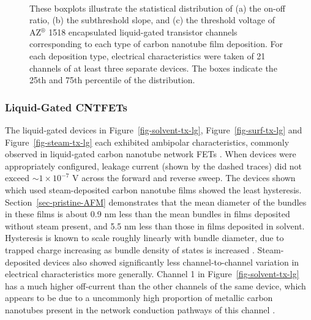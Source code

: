 \documentclass[
  a4paper,
]{scrbook}
\begin{document}
\begin{figure}
\begin{minipage}[t]{0.47\linewidth}
{{}

}

\subcaption{\label{fig-threshold-voltage}}
\end{minipage}%
%
\begin{minipage}[t]{0.26\linewidth}

{\centering 

~

}

\end{minipage}%

\caption{\label{fig-sweep-parameters}These boxplots illustrate the
statistical distribution of (a) the on-off ratio, (b) the subthreshold
slope, and (c) the threshold voltage of AZ\(^\circledR\) 1518
encapsulated liquid-gated transistor channels corresponding to each type
of carbon nanotube film deposition. For each deposition type, electrical
characteristics were taken of 21 channels of at least three separate
devices. The boxes indicate the 25th and 75th percentile of the
distribution.}

\end{figure}

\hypertarget{liquid-gated-cntfets}{%
\subsubsection*{Liquid-Gated CNTFETs}\label{liquid-gated-cntfets}}

The liquid-gated devices in Figure~\ref{fig-solvent-tx-lg},
Figure~\ref{fig-surf-tx-lg} and Figure~\ref{fig-steam-tx-lg} each
exhibited ambipolar characteristics, commonly observed in liquid-gated
carbon nanotube network FETs
\autocite{Kauffman2008,Heller2009,JongYu2009,Derenskyi2014,Murugathas2018,Albarghouthi2022}.
When devices were appropriately configured, leakage current (shown by
the dashed traces) did not exceed \(\sim 1 \times 10^{-7}\) V across the
forward and reverse sweep. The devices shown which used steam-deposited
carbon nanotube films showed the least hysteresis.
Section~\ref{sec-pristine-AFM} demonstrates that the mean diameter of
the bundles in these films is about 0.9 nm less than the mean bundles in
films deposited without steam present, and 5.5 nm less than those in
films deposited in solvent. Hysteresis is known to scale roughly
linearly with bundle diameter, due to trapped charge increasing as
bundle density of states is increased \autocite{Pop2009}.
Steam-deposited devices also showed significantly less
channel-to-channel variation in electrical characteristics more
generally. Channel 1 in Figure~\ref{fig-solvent-tx-lg} has a much higher
off-current than the other channels of the same device, which appears to
be due to a uncommonly high proportion of metallic carbon nanotubes
present in the network conduction pathways of this channel
\autocite{Rouhi2011,Zaumseil2015}.
\end{document}
